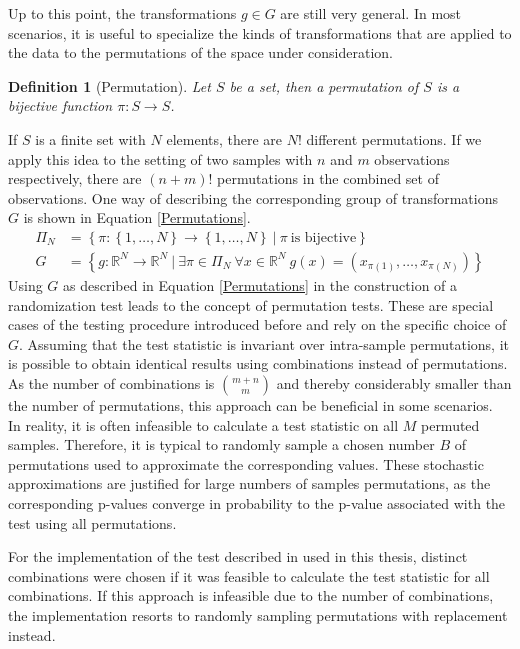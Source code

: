 \documentclass[12pt, a4paper]{article}
\theoremstyle{MAstyle} \newtheorem{assumption}{Assumption}[section]
\theoremstyle{MAstyle} \newtheorem{definition}{Definition}[section]
\theoremstyle{MAstyle} \newtheorem{theorem}{Theorem}[section]
\begin{document}
			Up to this point, the transformations $g \in G$ are still very general. In most scenarios, it is useful to specialize the kinds of transformations that are applied to the data to the permutations of the space under consideration.
			\begin{definition}[Permutation]\label{permutation}
				Let $S$ be a set, then a permutation of $S$ is a bijective function $\pi: S \rightarrow S$.
			\end{definition}
			If $S$ is a finite set with $N$ elements, there are $N!$ different permutations. If we apply this idea to the setting of two samples with $n$ and $m$ observations respectively, there are $(n+m)!$ permutations in the combined set of observations. One way of describing the corresponding group of transformations $G$ is shown in Equation \ref{Permutations}.
			\begin{equation}\label{Permutations}
				\begin{split}
					\Pi_N &= \left\{\pi: \left\{1, \dots, N \right\} \rightarrow \left\{1, \dots, N \right\} \ \vert \ \pi \ \text{is bijective} \right\} \\
					G &= \left\{g:\mathbb{R}^N \rightarrow \mathbb{R}^N \ \vert \ \exists \pi \in \Pi_N \ \forall x \in \mathbb{R}^N \ g(x) = \left(x_{\pi(1)}, \dots, x_{\pi(N)}\right) \right\}
				\end{split}
			\end{equation}
			Using $G$ as described in Equation \ref{Permutations} in the construction of a randomization test leads to the concept of permutation tests. These are special cases of the testing procedure introduced before and rely on the specific choice of $G$. Assuming that the test statistic is invariant over intra-sample permutations, it is possible to obtain identical results using combinations instead of permutations. As the number of combinations is $\binom{m+n}{m}$ and thereby considerably smaller than the number of permutations, this approach can be beneficial in some scenarios.\\

			In reality, it is often infeasible to calculate a test statistic on all $M$ permuted samples. Therefore, it is typical to randomly sample a chosen number $B$ of permutations used to approximate the corresponding values. These stochastic approximations are justified for large numbers of samples permutations, as the corresponding p-values converge in probability to the p-value associated with the test using all permutations. 
			
			For the implementation of the test described in \cite{bugni_permutation_2021} used in this thesis, distinct combinations were chosen if it was feasible to calculate the test statistic for all combinations. If this approach is infeasible due to the number of combinations, the implementation resorts to randomly sampling permutations with replacement instead.
			
\end{document}
